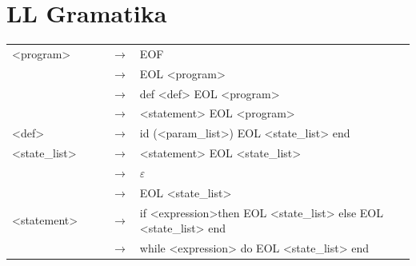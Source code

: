 \documentclass[a4paper, 11pt]{article}
\begin{document}
\section{LL Gramatika}
\begin{table}[!ht]
\centering
\begin{tabular}{lllll}
\textless{}program\textgreater{}        &  &  & $\rightarrow$ & EOF                                                                                                                              \\
                                        &  &  & $\rightarrow$ & EOL \textless{}program\textgreater{}                                                                                             \\
                                        &  &  & $\rightarrow$ & def \textless{}def\textgreater{} EOL \textless{}program\textgreater{}                                                              \\
                                        &  &  & $\rightarrow$ & \textless{}statement\textgreater{} EOL \textless{}program\textgreater{}                                                            \\
\textless{}def\textgreater{}            &  &  & $\rightarrow$ & id (\textless{}param\_list\textgreater{}) EOL \textless{}state\_list\textgreater{} end                                             \\
\textless{}state\_list\textgreater{}    &  &  & $\rightarrow$ & \textless{}statement\textgreater{} EOL \textless{}state\_list\textgreater{}                                                        \\
                                        &  &  & $\rightarrow$ & $\varepsilon$                                                                                                                    \\
                                        &  &  & $\rightarrow$ & EOL \textless{}state\_list\textgreater{}                                                                                         \\
\textless{}statement\textgreater{}      &  &  & $\rightarrow$ & if \textless{}expression\textgreater then EOL \textless{}state\_list\textgreater{} else EOL \textless{}state\_list\textgreater{} end \\
                                        &  &  & $\rightarrow$ & while \textless{}expression\textgreater{} do EOL \textless{}state\_list\textgreater{} end                                            \\

\end{tabular}
\end{table}
\end{document}
